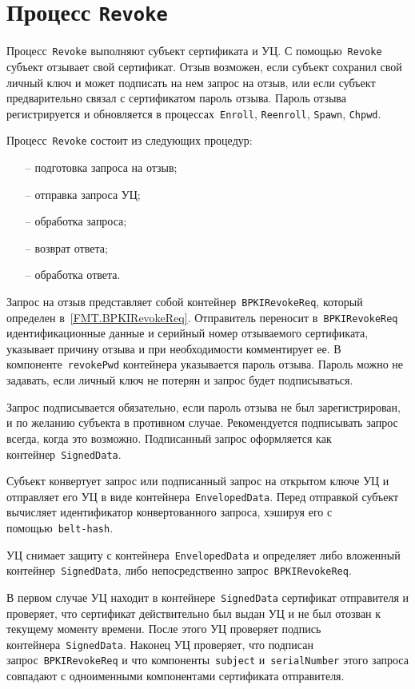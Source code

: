\section{Процесс \texttt{Revoke}}\label{PROCESSES.Revoke}

Процесс~\texttt{Revoke} выполняют субъект сертификата и УЦ. 
С помощью~\texttt{Revoke} субъект отзывает свой сертификат.
Отзыв возможен, если субъект сохранил свой личный ключ и может подписать 
на нем запрос на отзыв, или если субъект предварительно связал с 
сертификатом пароль отзыва. Пароль отзыва регистрируется и обновляется
в процессах~\texttt{Enroll}, \texttt{Reenroll}, \texttt{Spawn}, 
\texttt{Chpwd}.

Процесс~\texttt{Revoke} состоит из следующих процедур:
\begin{itemize}
\item[--]
подготовка запроса на отзыв;
\item[--]
отправка запроса УЦ;
\item[--]
обработка запроса;
\item[--]
возврат ответа;
\item[--]
обработка ответа.
\end{itemize}

Запрос на отзыв представляет собой контейнер~\texttt{BPKIRevokeReq},
который определен в~\ref{FMT.BPKIRevokeReq}.
Отправитель переносит в~\texttt{BPKIRevokeReq}
идентификационные данные и серийный номер отзываемого сертификата,
указывает причину отзыва и при необходимости комментирует ее.
В компоненте~\texttt{revokePwd} контейнера указывается пароль отзыва.
Пароль можно не задавать, если личный ключ не потерян и запрос будет
подписываться. 

Запрос подписывается обязательно, если пароль отзыва не был 
зарегистрирован, и по желанию субъекта в противном случае.
%
Рекомендуется подписывать запрос всегда, когда это возможно.
%
Подписанный запрос оформляется как контейнер~\texttt{SignedData}.

Субъект конвертует запрос или подписанный запрос на открытом ключе УЦ
и отправляет его УЦ в виде контейнера~\texttt{EnvelopedData}.
Перед отправкой субъект вычисляет идентификатор конвертованного запроса,
хэшируя его с помощью~\texttt{belt-hash}.

УЦ снимает защиту с контейнера~\texttt{EnvelopedData} и определяет 
либо вложенный контейнер~\texttt{SignedData}, либо непосредственно
запрос~\texttt{BPKIRevokeReq}.

В первом случае УЦ находит в контейнере~\texttt{SignedData}
сертификат отправителя и проверяет, что сертификат действительно 
был выдан УЦ и не был отозван к текущему моменту времени. 
После этого УЦ проверяет подпись контейнера~\texttt{SignedData}. 
Наконец УЦ проверяет, что  подписан запрос~\texttt{BPKIRevokeReq} и что 
компоненты~\texttt{subject} и~\texttt{serialNumber} этого запроса 
совпадают с одноименными компонентами сертификата отправителя.

